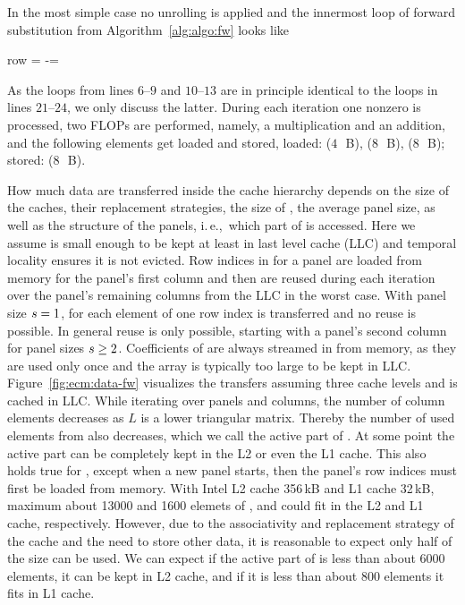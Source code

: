In the most simple case no unrolling is applied and the innermost loop of
forward substitution from Algorithm~\ref{alg:algo:fw} looks like
%
\begin{algorithmic}[1]
  \setcounter{ALG@line}{20}
      \State row = \nindx[i++]
      \State \nr[row] -= \nr[j] \nlnz[k]
  \EndFor
\end{algorithmic}%
\noindent%
%
As the loops from lines $6$--$9$ and $10$--$13$ are in principle identical to
the loops in lines $21$--$24$, we only discuss the latter.
%
During each iteration one nonzero is processed, two FLOPs are performed,
namely, a multiplication and an addition, and the following elements get
loaded and stored, loaded: \vindx{} ($4$~\,B), \vr{} ($8$~\,B), \vlnz{}
($8$~\,B); stored: \vr{} ($8$~\,B).

How much data are transferred inside the cache hierarchy depends on the size of
the caches, their replacement strategies, the size of \vr{}, the average panel
size, as well as the structure of the panels, i.\,e.,\ which part of \vr{} is
accessed.
Here we assume \vr{} is small enough to be kept at least in last level cache
(LLC) and temporal locality ensures it is not evicted.
%
Row indices in \vindx{} for a panel are loaded from memory for the panel's first
column and then are reused during each iteration over the panel's remaining
columns from the LLC in the worst case.
With panel size $s=1$, for each element of \vlnz{} one row index is
transferred and no reuse is possible.
In general reuse is only possible, starting with a panel's second column for
panel sizes $s \ge 2$.
%
Coefficients of \vlnz{} are always streamed in from memory, as they are
used only once and the array \vlnz{} is typically too large to be kept in LLC.
Figure~\ref{fig:ecm:data-fw} visualizes the transfers assuming three cache levels
and \vr{} is cached in LLC.
While iterating over panels and columns, the number of column elements
decreases as $L$ is a lower triangular matrix.
Thereby the number of used elements from \vr{} also decreases, which we call the
active part of \vr{}.
At some point the active part can be completely kept in the L2 or even the L1 cache.
This also holds true for \vindx{}, except when a new panel starts, then
the panel's row indices must first be loaded from memory.
With Intel L2 cache 356\,kB and L1 cache 32\,kB, maximum about 13000 and 1600 elemets of \vr{}, \vindx{} and \vlnz{} could fit in the L2 and L1 cache, respectively. However, due to the associativity and replacement strategy of the cache and the need to store other data, it is reasonable to expect only half of the size can be used. We can expect if the active part of \vr{} is less than about 6000 elements, it can be kept in L2 cache, and if it is less than about 800 elements it fits in L1 cache.

